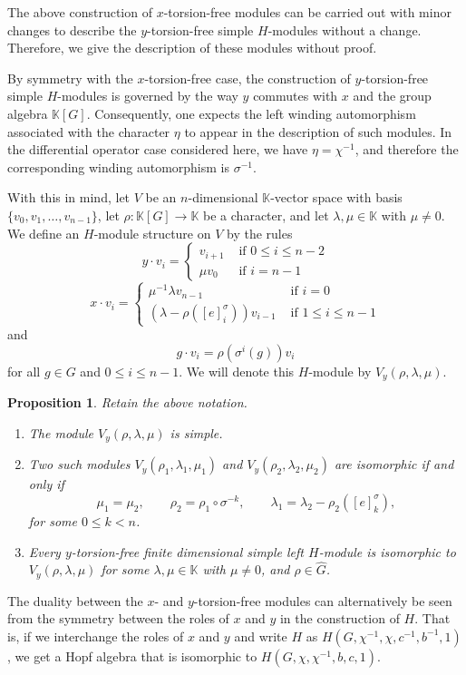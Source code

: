 \documentclass[11pt, twoside]{amsart}
\newtheorem{proposition}[theorem]{Proposition}
\theoremstyle{definition}
\newcommand{\KK}{\mathbb{K}}
\newcommand{\wind}[2]{[#1]_{#2}^{\sigma}}
\begin{document}
%
The above construction of $x$-torsion-free modules can be carried out with minor changes to describe the $y$-torsion-free simple $H$-modules without a change. Therefore, we give the description of these modules without proof.

By symmetry with the $x$-torsion-free case, the construction of $y$-torsion-free simple $H$-modules is governed by the way $y$ commutes with $x$ and the group algebra $\KK[G]$. Consequently, one expects the left winding automorphism associated with the character $\eta$ to appear in the description of such modules. In the differential operator case considered here, we have $\eta=\chi^{-1}$, and therefore the corresponding winding automorphism is $\sigma^{-1}$.

With this in mind, let $V$ be an $n$-dimensional $\KK$-vector space with basis $\{v_0,v_1,\ldots,v_{n-1}\}$, let $\rho:\KK[G]\to\KK$ be a character, and let $\lambda,\mu\in\KK$ with $\mu\neq 0$. We define an $H$-module structure on $V$ by the rules
%
\[y\cdot v_i = \begin{cases}v_{i+1} & \text{ if } 0 \leq i \leq n-2\\ \mu v_0 & \text{ if } i = n-1\end{cases}\]
%
\[x\cdot v_i = \begin{cases}\mu^{-1}\lambda v_{n-1} & \text{ if } i = 0\\ (\lambda - \rho(\wind{e}{i}))v_{i-1} & \text{ if } 1 \leq i \leq n-1
\end{cases}\]
%
and
%
\[g\cdot v_i = \rho(\sigma^{i}(g))v_i\]
%
for all $g \in G$ and $0 \leq i \leq n-1$. We will denote this $H$-module by $V_y (\rho, \lambda, \mu)$.
%
\begin{proposition}
    Retain the above notation.
    \begin{enumerate}
        \item The module $V_y (\rho, \lambda, \mu)$ is simple.
        \item Two such modules $V_y (\rho_1, \lambda_1, \mu_1)$ and $V_y (\rho_2, \lambda_2, \mu_2)$ are isomorphic if and only if 
        $$\mu_1 = \mu_2, \qquad \rho_2 = \rho_1 \circ \sigma^{-k}, \qquad \lambda_1 = \lambda_2 - \rho_{2}(\wind{e}{k}),$$
        for some $0\leq k < n$.
        \item Every $y$-torsion-free finite dimensional simple left $H$-module is isomorphic to $V_y (\rho, \lambda, \mu)$ for some $\lambda, \mu \in \KK$ with $\mu \neq 0$, and  $\rho\in \widehat{G}$.
    \end{enumerate}
\end{proposition}
%
The duality between the $x$- and $y$-torsion-free modules can alternatively be seen from the symmetry between the roles of $x$ and $y$ in the construction of $H$. That is, if we interchange the roles of $x$ and $y$ and write $H$ as $H(G, \chi^{-1}, \chi, c^{-1}, b^{-1}, 1)$, we get a Hopf algebra that is isomorphic to $H(G, \chi, \chi^{-1}, b, c, 1)$. 
\end{document}

